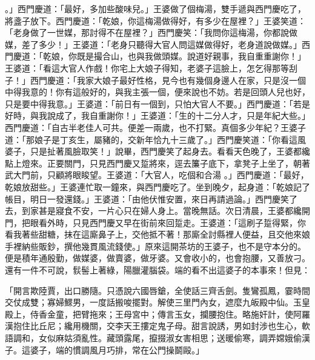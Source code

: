\begin{showcontents}{}
。」西門慶道：「最好，多加些酸味兒。」王婆做了個梅湯，雙手遞與西門慶吃了，將盞子放下。西門慶道：「乾娘，你這梅湯做得好，有多少在屋裡？」王婆笑道：「老身做了一世媒，那討得不在屋裡？」西門慶笑：「我問你這梅湯，你都說做媒，差了多少！」王婆道：「老身只聽得大官人問這媒做得好，老身道說做媒。」西門慶道：「乾娘，你既是撮合山，也與我做頭媒。說道好親事，我自重重謝你！」王婆道：「看這大官人作戲！你宅上大娘子得知，老婆子這臉上，怎乞得那等刮子！」西門慶道：「我家大娘子最好性格，見今也有幾個身邊人在家，只是沒一個中得我意的！你有這般好的，與我主張一個，便來說也不妨。若是回頭人兒也好，只是要中得我意。」王婆道：「前日有一個到，只怕大官人不要。」西門慶道：「若是好時，與我說成了，我自重謝你！」王婆道：「生的十二分人才，只是年紀大些。」西門慶道：「自古半老佳人可共。便差一兩歲，也不打緊。真個多少年紀？王婆子道：「那娘子是丁亥生，屬豬的，交新年恰九十三歲了。」西門慶笑道：「你看這風婆子，只是扯著風臉取笑！」說畢，西門慶笑了起身去。看看天色晚了，王婆都纔點上燈來。正要關門，只見西門慶又踅將來，逕去簾子底下，拿凳子上坐了，朝著武大門前，只顧將眼睃望。王婆道：「大官人，吃個和合湯 。」西門慶道：「最好，乾娘放甜些。」王婆連忙取一鐘來，與西門慶吃了。坐到晚夕，起身道：「乾娘記了帳目，明日一發還錢。」王婆道：「由他伏惟安置，來日再請過論。」西門慶笑了去，到家甚是寢食不安，一片心只在婦人身上。當晚無話。次日清晨，王婆都纔開門，把眼看外時，只見西門慶又早在街前來回踅走。王婆道：「這刷子踅得緊，你看我著些甜糖，抹在這廝鼻子上，交他抵不著！那廝全討縣裡人便益，且交他來娘手裡納些販鈔，撰他幾貫風流錢使。」原來這開茶坊的王婆子，也不是守本分的。便是積年通殷勤，做媒婆，做賣婆，做牙婆。又會收小的，也會抱腰，又善放刁。還有一件不可說，䯼髻上著綠，陽臘灌腦袋。端的看不出這婆子的本事來！但見：

「開言欺陸賈，出口勝隨。只憑說六國唇鎗，全使話三齊舌劍。隻鸞孤鳳，霎時間交仗成雙；寡婦鰥男，一度話搬唆擺對。解使三里門內女，遮麼九皈殿中仙。玉皇殿上，侍香金童，把臂拖來；王母宮中；傳言玉女，攔腰抱住。略施奸計，使阿羅漢抱住比丘尼；纔用機關，交李天王摟定鬼子母。甜言說誘，男如封涉也生心，軟語調和，女似麻姑須亂性。藏頭露尾，攛掇淑女害相思；送暖偷寒，調弄嫦娥偷漢子。這婆子，端的慣調風月巧排，常在公門操鬬毆。」


\end{showcontents}
